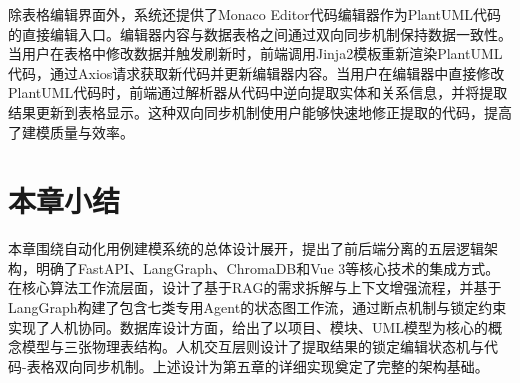 除表格编辑界面外，系统还提供了Monaco Editor代码编辑器作为PlantUML代码的直接编辑入口。编辑器内容与数据表格之间通过双向同步机制保持数据一致性。当用户在表格中修改数据并触发刷新时，前端调用Jinja2模板重新渲染PlantUML代码，通过Axios请求获取新代码并更新编辑器内容。当用户在编辑器中直接修改PlantUML代码时，前端通过解析器从代码中逆向提取实体和关系信息，并将提取结果更新到表格显示。这种双向同步机制使用户能够快速地修正提取的代码，提高了建模质量与效率。

\section{本章小结}

本章围绕自动化用例建模系统的总体设计展开，提出了前后端分离的五层逻辑架构，明确了FastAPI、LangGraph、ChromaDB和Vue 3等核心技术的集成方式。在核心算法工作流层面，设计了基于RAG的需求拆解与上下文增强流程，并基于LangGraph构建了包含七类专用Agent的状态图工作流，通过断点机制与锁定约束实现了人机协同。数据库设计方面，给出了以项目、模块、UML模型为核心的概念模型与三张物理表结构。人机交互层则设计了提取结果的锁定编辑状态机与代码-表格双向同步机制。上述设计为第五章的详细实现奠定了完整的架构基础。